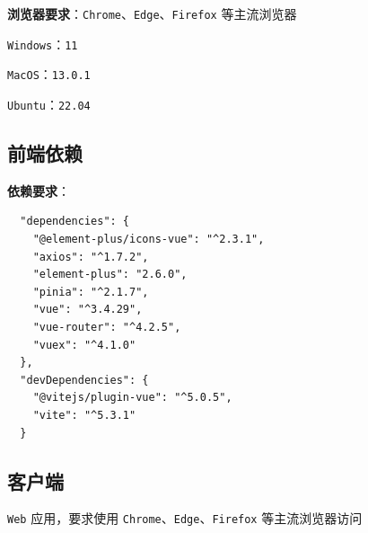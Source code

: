 \documentclass[12pt,a4paper,UTF8]{article}
\begin{document}
\textbf{浏览器要求}：\verb|Chrome|、\verb|Edge|、\verb|Firefox| 等主流浏览器

\verb|Windows|：\verb|11|

\verb|MacOS|：\verb|13.0.1|

\verb|Ubuntu|：\verb|22.04|

\subsection{前端依赖}

\textbf{依赖要求}：

\vspace{0.25cm} %

\begin{lstlisting}
  "dependencies": {
    "@element-plus/icons-vue": "^2.3.1",
    "axios": "^1.7.2",
    "element-plus": "2.6.0",
    "pinia": "^2.1.7",
    "vue": "^3.4.29",
    "vue-router": "^4.2.5",
    "vuex": "^4.1.0"
  },
  "devDependencies": {
    "@vitejs/plugin-vue": "^5.0.5",
    "vite": "^5.3.1"
  }
\end{lstlisting}

\subsection{客户端}

\verb|Web| 应用，要求使用 \verb|Chrome|、\verb|Edge|、\verb|Firefox| 等主流浏览器访问



\end{document}
